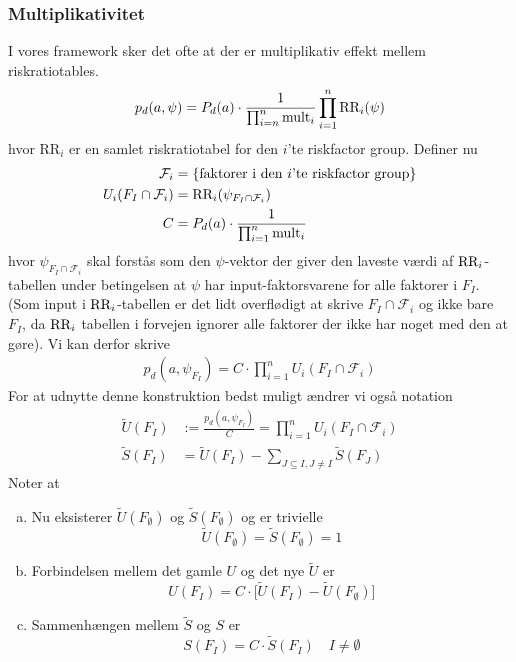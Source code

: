 \documentclass[a4paper, 12pt]{article}
\begin{document}
\subsubsection{Multiplikativitet}

I vores framework sker det ofte at der er multiplikativ effekt mellem riskratiotables.
\begin{equation}
p_d(a,\psi)=P_d(a)\cdot \frac{1}{\prod_{i=n}^n \textup{mult}_i} \prod_{i=1}^n \textup{RR}_i(\psi)\label{multiplicative_groups}
\end{equation}
hvor $\text{RR}_i$ er en samlet riskratiotabel for den $i$'te riskfactor group. Definer nu 
\begin{align}
\mathcal F_i&=\{\textup{faktorer i den $i$'te riskfactor group}\}\\
U_i(F_I\cap \mathcal F_i)&=\textup{RR}_i(\psi_{F_I\cap \mathcal F_i})\\
C&=P_d(a)\cdot \frac{1}{\prod_{i=1}^n \textup{mult}_i} 
\end{align}
hvor $\psi_{F_I \cap \mathcal F_i}$ skal forstås som den $\psi$-vektor der giver den laveste værdi af $\textup{RR}_i$-tabellen under betingelsen at $\psi$ har input-faktorsvarene for alle faktorer i $F_I$. (Som input i $\textup{RR}_i$-tabellen er det lidt overflødigt at skrive $F_I\cap \mathcal F_i$ og ikke bare $F_I$, da $\textup{RR}_i$ tabellen i forvejen ignorer alle faktorer der ikke har noget med den at gøre). Vi kan derfor skrive
\begin{align}
p_d(a,\psi_{F_I})=C\cdot \prod_{i=1}^n U_i(F_I\cap \mathcal F_i)
\end{align}
For at udnytte denne konstruktion bedst muligt ændrer vi også notation 
\begin{align*}
\tilde U(F_I)&:=\frac{p_d(a,\psi_{F_I})}{C}=\prod_{i=1}^nU_i(F_I\cap \mathcal F_i)\\
\tilde S(F_I)&=\tilde U(F_I)-\sum_{J\subseteq I, J\neq I} \tilde S(F_J)
\end{align*}
Noter at 
\begin{enumerate}[a.]
\item
Nu eksisterer $\tilde U(F_{\emptyset})$ og $\tilde S(F_{\emptyset})$ og er trivielle
\begin{equation}
\tilde U(F_{\emptyset})=\tilde S(F_{\emptyset})= 1
\end{equation}
\item
Forbindelsen mellem det gamle $U$ og det nye $\tilde U$ er
\begin{equation}
U(F_I)=C\cdot \bigl[\tilde U(F_I)-\tilde U(F_{\emptyset})\bigr]
\end{equation}
\item
Sammenhængen mellem $\tilde S$ og $S$ er
\begin{equation}
S(F_I)=C\cdot \tilde S(F_I) \quad I\neq \emptyset\label{SStilde}
\end{equation}
\end{enumerate}
\end{document}
